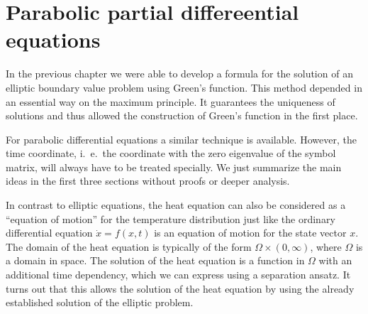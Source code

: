 %
%
%
\chapter{Parabolic partial differeential equations
\label{chapter-parabolisch}}
\rhead{}
In the previous chapter we were able to develop a formula for the
solution of an elliptic boundary value problem using Green's 
function.
This method depended in an essential way on the maximum principle.
It guarantees the uniqueness of solutions and thus allowed the
construction of Green's function in the first place.

For parabolic differential equations a similar technique is
available.
However, the time coordinate, i.~e.~the coordinate with 
the zero eigenvalue of the symbol matrix, will always have to be
treated specially.
We just summarize the main ideas in the first three sections
without proofs or deeper analysis.

In contrast to elliptic equations, the heat equation can also be
considered as a ``equation of motion'' for the temperature distribution
just like the ordinary differential equation $\dot x=f(x,t)$ is an
equation of motion for the state vector $x$.
The domain of the heat equation is typically of the form
$\Omega\times(0,\infty)$, where $\Omega$ is a domain in space.
The solution of the heat equation is a function in $\Omega$ with 
an additional time dependency, which we can express using a
separation ansatz.
It turns out that this allows the solution of the heat equation
by using the already established solution of the elliptic problem.








